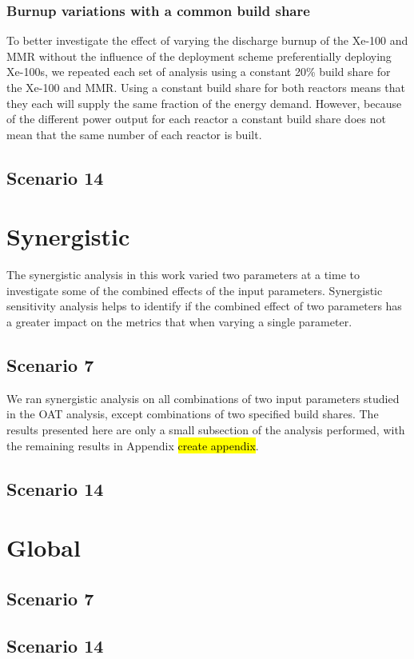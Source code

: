 \subsubsection{Burnup variations with a common build share}
To better investigate the effect of varying the discharge burnup of the Xe-100 
and \gls{MMR} without the influence of the deployment scheme preferentially
deploying Xe-100s, we repeated each set of analysis using a constant 20\% 
build share for the Xe-100 and \gls{MMR}. Using a constant build share for 
both reactors means that they each will supply the same fraction of the energy demand.
However, because of the different power output for each reactor a constant build 
share does not mean that the same number of each reactor is built. 

\subsection{Scenario 14}

\section{Synergistic}
The synergistic analysis in this work varied two parameters at a time to 
investigate some of the combined effects of the input parameters. Synergistic 
sensitivity analysis helps to identify if the combined effect of two parameters 
has a greater impact on the metrics that when varying a single parameter. 

\subsection{Scenario 7}
We ran synergistic 
analysis on all combinations of two input parameters studied in the \gls{OAT} 
analysis, except combinations of two specified build shares. The
results presented here are only a small subsection of the analysis performed, 
with the remaining results in Appendix \hl{create appendix}.
\subsubsection{}
\subsection{Scenario 14}

\section{Global}
\subsection{Scenario 7}

\subsection{Scenario 14}


